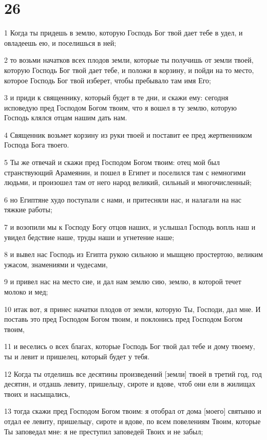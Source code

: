 \chapter{26}

\par 1 Когда ты придешь в землю, которую Господь Бог твой дает тебе в удел, и овладеешь ею, и поселишься в ней;
\par 2 то возьми начатков всех плодов земли, которые ты получишь от земли твоей, которую Господь Бог твой дает тебе, и положи в корзину, и пойди на то место, которое Господь Бог твой изберет, чтобы пребывало там имя Его;
\par 3 и приди к священнику, который будет в те дни, и скажи ему: сегодня исповедую пред Господом Богом твоим, что я вошел в ту землю, которую Господь клялся отцам нашим дать нам.
\par 4 Священник возьмет корзину из руки твоей и поставит ее пред жертвенником Господа Бога твоего.
\par 5 Ты же отвечай и скажи пред Господом Богом твоим: отец мой был странствующий Арамеянин, и пошел в Египет и поселился там с немногими людьми, и произошел там от него народ великий, сильный и многочисленный;
\par 6 но Египтяне худо поступали с нами, и притесняли нас, и налагали на нас тяжкие работы;
\par 7 и возопили мы к Господу Богу отцов наших, и услышал Господь вопль наш и увидел бедствие наше, труды наши и угнетение наше;
\par 8 и вывел нас Господь из Египта рукою сильною и мышцею простертою, великим ужасом, знамениями и чудесами,
\par 9 и привел нас на место сие, и дал нам землю сию, землю, в которой течет молоко и мед;
\par 10 итак вот, я принес начатки плодов от земли, которую Ты, Господи, дал мне. И поставь это пред Господом Богом твоим, и поклонись пред Господом Богом твоим,
\par 11 и веселись о всех благах, которые Господь Бог твой дал тебе и дому твоему, ты и левит и пришелец, который будет у тебя.
\par 12 Когда ты отделишь все десятины произведений [земли] твоей в третий год, год десятин, и отдашь левиту, пришельцу, сироте и вдове, чтоб они ели в жилищах твоих и насыщались,
\par 13 тогда скажи пред Господом Богом твоим: я отобрал от дома [моего] святыню и отдал ее левиту, пришельцу, сироте и вдове, по всем повелениям Твоим, которые Ты заповедал мне: я не преступил заповедей Твоих и не забыл;
